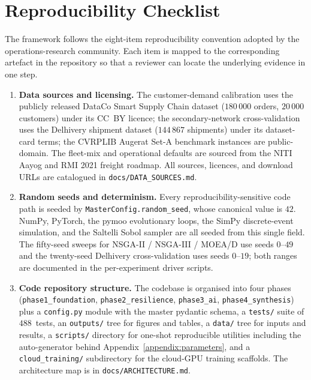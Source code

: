 \documentclass[review,preprint,authoryear,12pt]{elsarticle}
\begin{document}
\section{Reproducibility Checklist}
\label{appendix:reproducibility}

The framework follows the eight-item reproducibility convention
adopted by the operations-research community. Each item is mapped to
the corresponding artefact in the repository so that a reviewer can
locate the underlying evidence in one step.

\begin{enumerate}
\item \textbf{Data sources and licensing.} The customer-demand
calibration uses the publicly released DataCo Smart Supply Chain
dataset ($180\,000$ orders, $20\,000$ customers) under its CC~BY
licence; the secondary-network cross-validation uses the Delhivery
shipment dataset ($144\,867$ shipments) under its dataset-card terms;
the CVRPLIB Augerat Set-A benchmark instances are public-domain. The
fleet-mix and operational defaults are sourced from the NITI Aayog
and RMI 2021 freight roadmap. All sources, licences, and download
URLs are catalogued in \texttt{docs/DATA\_SOURCES.md}.

\item \textbf{Random seeds and determinism.} Every
reproducibility-sensitive code path is seeded by
\texttt{MasterConfig.random\_seed}, whose canonical value is $42$.
NumPy, PyTorch, the pymoo evolutionary loops, the SimPy
discrete-event simulation, and the Saltelli Sobol sampler are all
seeded from this single field. The fifty-seed sweeps for
NSGA-II / NSGA-III / MOEA/D use seeds $0$--$49$ and the twenty-seed
Delhivery cross-validation uses seeds $0$--$19$; both ranges are
documented in the per-experiment driver scripts.

\item \textbf{Code repository structure.} The codebase is organised
into four phases (\texttt{phase1\_foundation},
\texttt{phase2\_resilience}, \texttt{phase3\_ai},
\texttt{phase4\_synthesis}) plus a \texttt{config.py} module with
the master pydantic schema, a \texttt{tests/} suite of
$488$~tests, an \texttt{outputs/} tree for figures and tables, a
\texttt{data/} tree for inputs and results, a \texttt{scripts/}
directory for one-shot reproducible utilities including the
auto-generator behind Appendix~\ref{appendix:parameters}, and a
\texttt{cloud\_training/} subdirectory for the cloud-GPU training
scaffolds. The architecture map is in
\texttt{docs/ARCHITECTURE.md}.


\end{enumerate}
\end{document}
